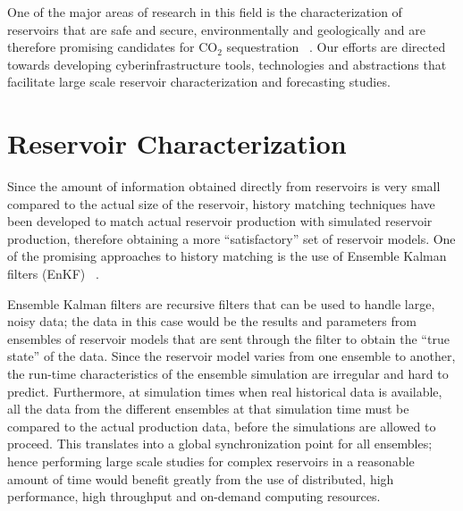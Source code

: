 \documentclass[10pt,conference,final]{IEEEtran}
\begin{document}
One of the major areas of research in this field is the characterization of reservoirs 
that are safe and secure, environmentally 
and geologically and are therefore promising candidates for CO$_2$ sequestration 
~\cite{GeoRPT,Luigi}. Our efforts are directed 
towards developing cyberinfrastructure tools, technologies and abstractions that 
facilitate large scale reservoir characterization 
and forecasting studies.

\section*{Reservoir Characterization}

Since the amount of information obtained directly from reservoirs is very small compared 
to the actual size of the reservoir, 
history matching techniques have been developed to match actual reservoir production with 
simulated reservoir production, 
therefore obtaining a more ``satisfactory'' set of reservoir models. One of the promising approaches 
to history matching is the use of Ensemble Kalman filters (EnKF) ~\cite{KalmanPaper, 
DO2007, LiEnKF07, DO2006}.

Ensemble Kalman filters are recursive filters that can be used to handle large, noisy 
data; the data in this case would be the results and parameters from ensembles of 
reservoir models that are sent through the filter to obtain the ``true state'' of the 
data. Since the reservoir model varies from one ensemble to another, the run-time 
characteristics of the ensemble simulation are irregular and hard to predict. Furthermore, 
at simulation times when real historical data is available, all the data from the 
different ensembles at that simulation time must be compared to the actual production 
data, before the simulations are allowed to proceed. This translates into a global 
synchronization point for all ensembles; hence performing large scale studies for complex 
reservoirs in a reasonable amount of time would benefit greatly from the use of 
distributed, high performance, high throughput and on-demand computing resources.
\end{document}
